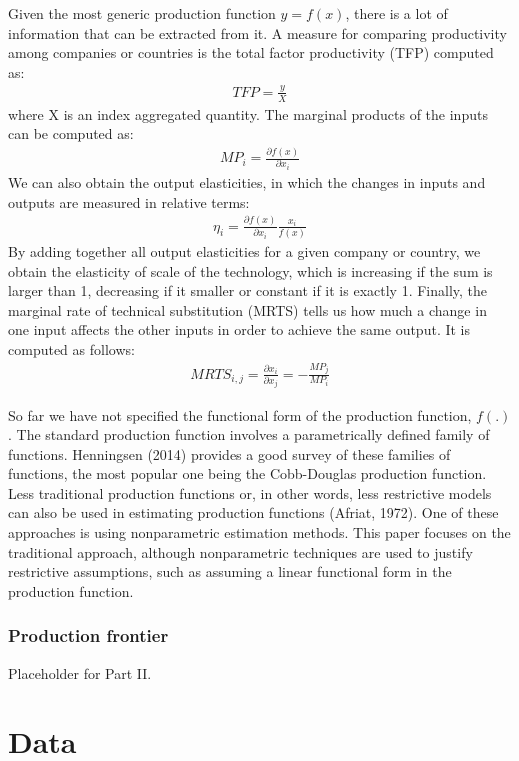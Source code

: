 \documentclass[12pt,a4paper]{article}\usepackage[]{graphicx}\usepackage[]{color}
\begin{document}
Given the most generic production function $y = f(x)$, there is a lot of information that can be extracted from it. A measure for comparing productivity among companies or countries is the total factor productivity (TFP) computed as:
\begin{align*}
TFP = \frac{y}{X}
\end{align*}
where X is an index aggregated quantity. The marginal products of the inputs can be computed as:
\begin{align*}
MP_i = \frac{\partial f(x)}{\partial x_i}
\end{align*}
We can also obtain the output elasticities, in which the changes in inputs and outputs are measured in relative terms:
\begin{align*}
\eta_i =  \frac{\partial f(x)}{\partial x_i} \frac{x_i}{f(x)}
\end{align*}
By adding together all output elasticities for a given company or country, we obtain the elasticity of scale of the technology, which is increasing if the sum is larger than 1, decreasing if it smaller or constant if it is exactly 1.
Finally, the marginal rate of technical substitution (MRTS) tells us how much a change in one input affects the other inputs in order to achieve the same output. It is computed as follows:
\begin{align*}
MRTS_{i,j} =  \frac{\partial x_i}{\partial x_j} = - \frac{MP_j}{MP_i}
\end{align*}

So far we have not specified the functional form of the production function, $f(.)$. The standard production function involves a parametrically defined family of functions. Henningsen (2014) provides a good survey of these families of functions, the most popular one being the Cobb-Douglas production function. Less traditional production functions or, in other words, less restrictive models can also be used in estimating production functions (Afriat, 1972). One of these approaches is using nonparametric estimation methods. This paper focuses on the traditional approach, although nonparametric techniques are used to justify restrictive assumptions, such as assuming a linear functional form in the production function.


\subsubsection{Production frontier}
Placeholder for Part II.


% 
\section{Data}
\end{document}
